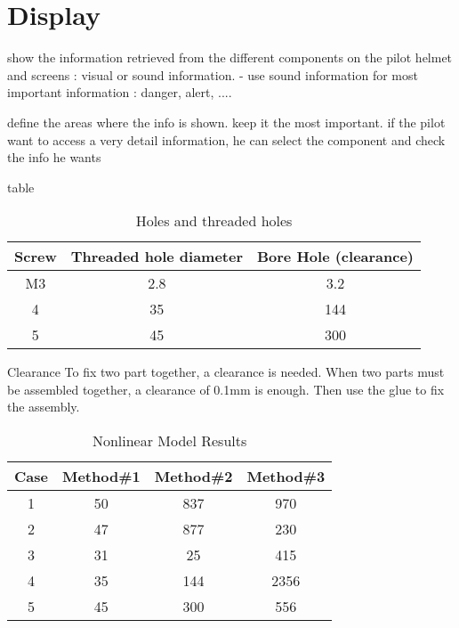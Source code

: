 \documentclass[12pt,a4paper]{article}
\begin{document}
\section{Display}

show the information retrieved from the different components on the pilot helmet and screens : visual or sound information.
- use sound information for most important information : danger, alert, ....

define the areas where the info is shown.
keep it the most important.
if the pilot want to access a very detail information, he can select the component and check the info he wants




table

\begin{table}[ht]
	\caption{Holes and threaded holes} %
	\centering %
	\begin{tabular}{c c c} %
		\hline\hline %
		Screw & Threaded hole diameter & Bore Hole (clearance) \\ [0.5ex] %
		\hline %
		M3 & 2.8 & 3.2 \\ %
		4 & 35 & 144 \\
		5 & 45 & 300 \\ [1ex] %
		\hline %
	\end{tabular}\label{table:nonlin} %
\end{table}

Clearance
To fix two part together, a clearance is needed.
When two parts must be assembled together, a clearance of 0.1mm is enough. Then use the glue to fix the assembly. 



\begin{table}[ht]
	\caption{Nonlinear Model Results} %
	\centering %
	\begin{tabular}{c c c c} %
		\hline\hline %
		Case & Method\#1 & Method\#2 & Method\#3 \\ [0.5ex] %
		\hline %
		1 & 50 & 837 & 970 \\ %
		2 & 47 & 877 & 230 \\
		3 & 31 & 25 & 415 \\
		4 & 35 & 144 & 2356 \\
		5 & 45 & 300 & 556 \\ [1ex] %
		\hline %
	\end{tabular}\label{table:nonlin} %
\end{table}
\end{document}
